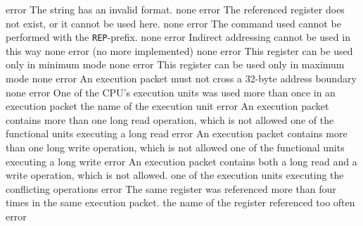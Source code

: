\documentclass[12pt,twoside]{report}
\newcommand{\tty}[1]{{\tt #1}}
\begin{document}
\begin{description}
               {error}
               {The string has an invalid format.}
               {none}
               {error}
               {The referenced register does not exist, or it cannot
                be used here.}
               {none}
               {error}
               {The command used cannot be performed with the \tty{REP}-prefix.}
               {none}
               {error}
               {Indirect addressing cannot be used in this way}
               {none}
               {error}
               {(no more implemented)}
               {none}
               {error}
               {This register can be used only in minimum mode}
               {none}
               {error}
               {This register can be used only in maximum mode}
               {none}
               {error}
               {An execution packet must not cross a 32-byte address
                boundary}
               {none}
               {error}
               {One of the CPU's execution units was used more than
                once in an execution packet}
               {the name of the execution unit}
               {error}
               {An execution packet contains more than one long read
                operation, which is not allowed}
               {one of the functional units executing a long read}
               {error}
               {An execution packet contains more than one long write
                operation, which is not allowed}
               {one of the functional units executing a long write}
               {error}
               {An execution packet contains both a long read and a write
                operation, which is not allowed.}
               {one of the execution units executing the conflicting
                operations}
               {error}
               {The same register was referenced more than four times in
                the same execution packet.}
               {the name of the register referenced too often}
               {error}

\end{description}
\end{document}
